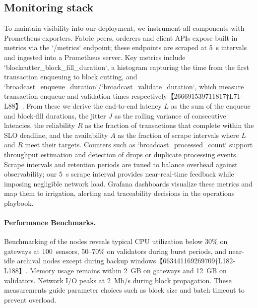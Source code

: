 \subsection{Monitoring stack}
To maintain visibility into our deployment, we instrument all components with Prometheus exporters.  Fabric peers, orderers and client APIs expose built‑in metrics via the `/metrics` endpoint; these endpoints are scraped at 5~s intervals and ingested into a Prometheus server.  Key metrics include `blockcutter_block_fill_duration`, a histogram capturing the time from the first transaction enqueuing to block cutting, and `broadcast_enqueue_duration`/`broadcast_validate_duration`, which measure transaction enqueue and validation times respectively【266691539711817†L71-L88】.  From these we derive the end‑to‑end latency $L$ as the sum of the enqueue and block‑fill durations, the jitter $J$ as the rolling variance of consecutive latencies, the reliability $R$ as the fraction of transactions that complete within the SLO deadline, and the availability $A$ as the fraction of scrape intervals where $L$ and $R$ meet their targets.  Counters such as `broadcast_processed_count` support throughput estimation and detection of drops or duplicate processing events.  Scrape intervals and retention periods are tuned to balance overhead against observability; our 5~s scrape interval provides near‑real‑time feedback while imposing negligible network load.  Grafana dashboards visualize these metrics and map them to irrigation, alerting and traceability decisions in the operations playbook.

\paragraph{Performance Benchmarks.}  Benchmarking of the nodes reveals typical CPU utilization below 30\% on gateways at 100~sensors, 50–70\% on validators during burst periods, and near-idle archival nodes except during backup windows【663441169269709†L182-L188】.  Memory usage remains within 2~GB on gateways and 12~GB on validators.  Network I/O peaks at 2~Mb/s during block propagation.  These measurements guide parameter choices such as block size and batch timeout to prevent overload.

